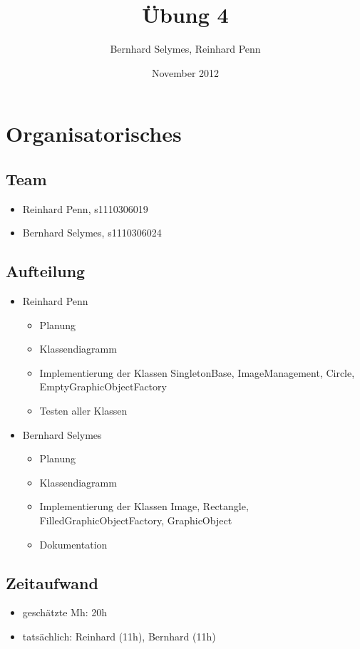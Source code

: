 \documentclass[12pt,a4paper]{article}
\begin{document}
\title{Übung 4}
\author{Bernhard Selymes, Reinhard Penn}
\date{November 2012}

\normalsize

\newcommand{\CodePath}{../ImageProcessing/ImageProcessing/}

\section{Organisatorisches}

\subsection{Team}
	\begin {itemize} 
		\item Reinhard Penn, s1110306019 
		\item Bernhard Selymes, s1110306024
	\end {itemize}

\subsection{Aufteilung}
	\begin {itemize} 
		\item Reinhard Penn
			\begin {itemize}
				\item Planung
				\item Klassendiagramm
				\item Implementierung der Klassen SingletonBase, ImageManagement, Circle, EmptyGraphicObjectFactory
				\item Testen aller Klassen
			\end {itemize}
		\item Bernhard Selymes
			\begin {itemize}
				\item Planung
				\item Klassendiagramm
				\item Implementierung der Klassen Image, Rectangle, FilledGraphicObjectFactory, GraphicObject
				\item Dokumentation			
			\end {itemize}
	\end {itemize}


\subsection{Zeitaufwand}
	\begin {itemize}
		\item geschätzte Mh: 20h
		\item tatsächlich: Reinhard (11h), Bernhard  (11h)
	\end {itemize}
\end{document}
